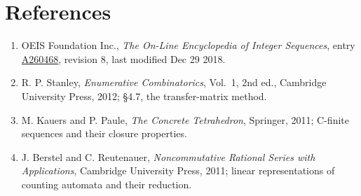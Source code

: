 \documentclass[11pt]{article}
\theoremstyle{definition}
\begin{document}
\section{References}

\begin{enumerate}

\item OEIS Foundation Inc., \emph{The On-Line Encyclopedia of Integer Sequences}, entry \href{https://oeis.org/A260468}{A260468}, revision 8, last modified Dec 29 2018.

\item R. P. Stanley, \emph{Enumerative Combinatorics}, Vol.~1, 2nd ed., Cambridge University Press, 2012; \S4.7, the transfer-matrix method.

\item M. Kauers and P. Paule, \emph{The Concrete Tetrahedron}, Springer, 2011; C-finite sequences and their closure properties.

\item J. Berstel and C. Reutenauer, \emph{Noncommutative Rational Series with Applications}, Cambridge University Press, 2011; linear representations of counting automata and their reduction.

\end{enumerate}
\end{document}
